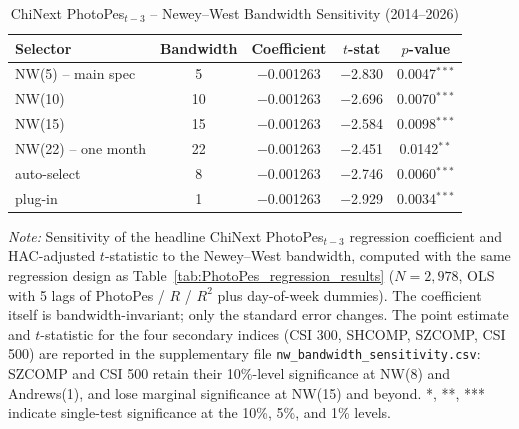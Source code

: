 \documentclass[AER]{AEA}
\begin{document}
\begin{table}[h!]
    \centering
    \caption{ChiNext PhotoPes$_{t-3}$ -- Newey--West Bandwidth Sensitivity (2014--2026)}
    \label{tab:nw_bandwidth}
    \setlength{\tabcolsep}{6pt}
    \small
    \begin{tabular}{lcccc}
    \toprule
    Selector & Bandwidth & Coefficient & $t$-stat & $p$-value \\
    \midrule
    NW(5) -- main spec       & 5  & $-$0.001263 & $-$2.830 & 0.0047$^{***}$ \\
    NW(10)                   & 10 & $-$0.001263 & $-$2.696 & 0.0070$^{***}$ \\
    NW(15)                   & 15 & $-$0.001263 & $-$2.584 & 0.0098$^{***}$ \\
    NW(22) -- one month      & 22 & $-$0.001263 & $-$2.451 & 0.0142$^{**}$  \\
    \citet{newey1994automatic} auto-select & 8 & $-$0.001263 & $-$2.746 & 0.0060$^{***}$ \\
    \citet{andrews1991heteroskedasticity} plug-in & 1 & $-$0.001263 & $-$2.929 & 0.0034$^{***}$ \\
    \bottomrule
    \end{tabular}

    \vspace{0.2cm}
    \footnotesize
    \textit{Note:} Sensitivity of the headline ChiNext PhotoPes$_{t-3}$ regression coefficient and HAC-adjusted $t$-statistic to the Newey--West bandwidth, computed with the same regression design as Table~\ref{tab:PhotoPes_regression_results} ($N=2{,}978$, OLS with 5 lags of PhotoPes / $R$ / $R^2$ plus day-of-week dummies). The coefficient itself is bandwidth-invariant; only the standard error changes. The point estimate and $t$-statistic for the four secondary indices (CSI 300, SHCOMP, SZCOMP, CSI 500) are reported in the supplementary file \texttt{nw\_bandwidth\_sensitivity.csv}: SZCOMP and CSI 500 retain their 10\%-level significance at NW(8) and Andrews(1), and lose marginal significance at NW(15) and beyond. *, **, *** indicate single-test significance at the 10\%, 5\%, and 1\% levels.
\end{table}
\end{document}
